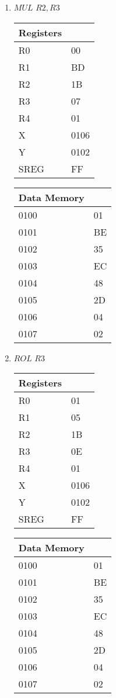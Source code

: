 \documentclass[12pt,letterpaper]{article}
\begin{document}
\begin{enumerate}
\begin{enumerate}[i]
    \item $MUL$  $R2,R3$\\
        \begin{tabular}{l l}
            Registers & \\
            \hline
            R0   & 00 \\
            R1   & BD \\
            R2   & 1B \\
            R3   & 07 \\
            R4   & 01 \\
            X    & 0106 \\
            Y    & 0102 \\
            SREG & FF \\
        \end{tabular}
        \begin{tabular}{l l}
            Data Memory & \\
            \hline
            0100 & 01 \\
            0101 & BE \\
            0102 & 35 \\
            0103 & EC \\
            0104 & 48 \\
            0105 & 2D \\
            0106 & 04 \\
            0107 & 02 \\
        \end{tabular}

    \item $ROL$  $R3$\\
        \begin{tabular}{l l}
            Registers & \\
            \hline
            R0   & 01 \\
            R1   & 05 \\
            R2   & 1B \\
            R3   & 0E \\
            R4   & 01 \\
            X    & 0106 \\
            Y    & 0102 \\
            SREG & FF \\
        \end{tabular}
        \begin{tabular}{l l}
            Data Memory & \\
            \hline
            0100 & 01 \\
            0101 & BE \\
            0102 & 35 \\
            0103 & EC \\
            0104 & 48 \\
            0105 & 2D \\
            0106 & 04 \\
            0107 & 02 \\
        \end{tabular}
    \end{enumerate}
\end{enumerate}
\end{document}
